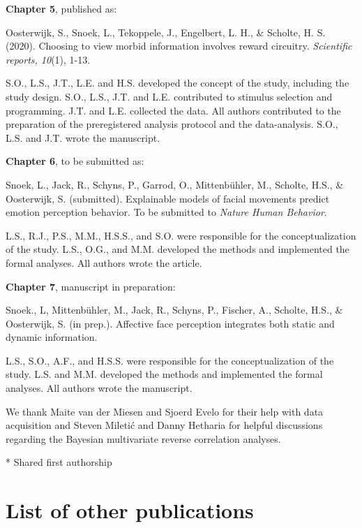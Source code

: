 \documentclass[11pt,american,a4paper,oneside,]{memoir} %
\begin{document}
\textbf{Chapter 5}, published as:

Oosterwijk, S., Snoek, L., Tekoppele, J., Engelbert, L. H., \& Scholte, H. S. (2020). Choosing to view morbid information involves reward circuitry. \emph{Scientific reports, 10}(1), 1-13.

S.O., L.S., J.T., L.E. and H.S. developed the concept of the study, including the study design. S.O., L.S., J.T. and L.E. contributed to stimulus selection and programming. J.T. and L.E. collected the data. All authors contributed to the preparation of the preregistered analysis protocol and the data-analysis. S.O., L.S. and J.T. wrote the manuscript.

\textbf{Chapter 6}, to be submitted as:

Snoek, L., Jack, R., Schyns, P., Garrod, O., Mittenbühler, M., Scholte, H.S., \& Oosterwijk, S. (submitted). Explainable models of facial movements predict emotion perception behavior. To be submitted to \emph{Nature Human Behavior}.

L.S., R.J., P.S., M.M., H.S.S., and S.O. were responsible for the conceptualization of the study. L.S., O.G., and M.M. developed the methods and implemented the formal analyses. All authors wrote the article.

\textbf{Chapter 7}, manuscript in preparation:

Snoek., L, Mittenbühler, M., Jack, R., Schyns, P., Fischer, A., Scholte, H.S., \& Oosterwijk, S. (in prep.). Affective face perception integrates both static and dynamic information.

L.S., S.O., A.F., and H.S.S. were responsible for the conceptualization of the study. L.S. and M.M. developed the methods and implemented the formal analyses. All authors wrote the manuscript.

We thank Maite van der Miesen and Sjoerd Evelo for their help with data acquisition and Steven Miletić and Danny Hetharia for helpful discussions regarding the Bayesian multivariate reverse correlation analyses.

* Shared first authorship

\hypertarget{list-of-other-publications}{%
\chapter*{List of other publications}\label{list-of-other-publications}}

\end{document}
